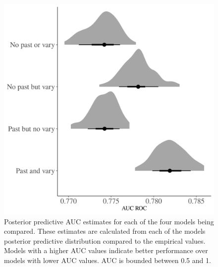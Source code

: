 \documentclass[12pt,letterpaper]{article}
\begin{document}
\begin{figure}[ht]
  \centering
  \includegraphics[width=\textwidth,height=0.5\textheight,keepaspectratio=true]{../results/figure/auc_hist}
  \caption{Posterior predictive AUC estimates for each of the four models being compared. These estimates are calculated from each of the models posterior predictive distribution compared to the empirical values. Models with a higher AUC values indicate better performance over models with lower AUC values. AUC is bounded between 0.5 and 1.}
  \label{fig:auc_hist}
\end{figure}
\end{document}
